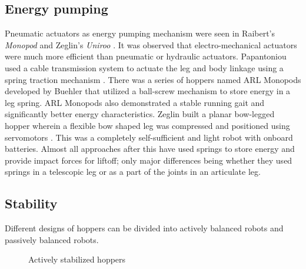 \subsection{Energy pumping}
Pneumatic actuators as energy pumping mechanism were seen in Raibert's \emph{Monopod} \cite{raibert_monopod} and Zeglin's \emph{Uniroo} \cite{zeglin}. It was observed that electro-mechanical actuators were much more efficient than pneumatic or hydraulic actuators. 
Papantoniou used a cable transmission system to actuate the leg and body linkage using a spring traction mechanism \cite{papan}.
There was a series of hoppers named ARL Monopods developed by Buehler \cite{ARLMono1, ARLMono2} that utilized a ball-screw mechanism to store
energy in a leg spring. ARL Monopods also demonstrated a stable running gait and significantly better energy characteristics.
Zeglin built a planar bow-legged hopper wherein a flexible bow shaped leg was compressed and positioned using servomotors \cite{bowleg}. This was a completely self-sufficient and light robot with onboard batteries. Almost all approaches after this have
used springs to store energy and provide impact forces for liftoff; only major differences being whether they used springs in a
telescopic leg or as a part of the joints in an articulate leg.

\subsection{Stability}
Different designs of hoppers can be divided into actively balanced robots and passively balanced robots.
\begin{figure}[h]
  \centering
  \hspace{2cm}
  \caption[Actively stabilized hoppers]{Actively stabilized hoppers}
  \label{fig:1_activestable}
\end{figure}
